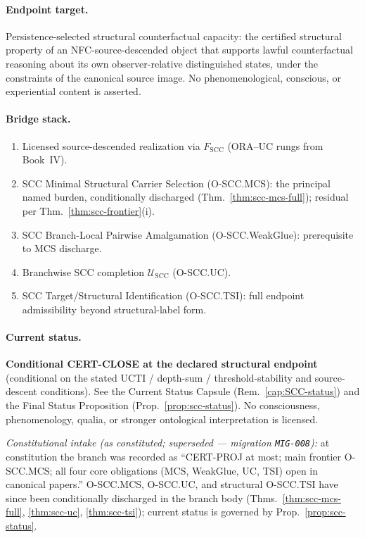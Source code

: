 \documentclass[12pt,oneside]{amsbook}
\theoremstyle{plain}
\theoremstyle{definition}
\theoremstyle{remark}
\begin{document}
\paragraph{Endpoint target.}
Persistence-selected structural counterfactual capacity: the
certified structural property of an NFC-source-descended object
that supports lawful counterfactual reasoning about its own
observer-relative distinguished states, under the constraints of
the canonical source image. No phenomenological, conscious, or
experiential content is asserted.

\paragraph{Bridge stack.}
\begin{enumerate}[label=\textup{(\arabic*)}]
 \item Licensed source-descended realization via
 $F_{\mathrm{SCC}}$ (ORA--UC rungs from Book~IV).
 \item SCC Minimal Structural Carrier Selection (O-SCC.MCS):
 the principal named burden, conditionally discharged
 (Thm.~\ref{thm:scc-mcs-full}); residual per
 Thm.~\ref{thm:scc-frontier}(i).
 \item SCC Branch-Local Pairwise Amalgamation (O-SCC.WeakGlue):
 prerequisite to MCS discharge.
 \item Branchwise SCC completion $\mathcal{U}_{\mathrm{SCC}}$
 (O-SCC.UC).
 \item SCC Target/Structural Identification (O-SCC.TSI): full
 endpoint admissibility beyond structural-label form.
\end{enumerate}

\paragraph{Current status.}
\textbf{Conditional CERT-CLOSE at the declared structural endpoint}
(conditional on the stated UCTI / depth-sum / threshold-stability and
source-descent conditions). See the Current Status Capsule
(Rem.~\ref{cap:SCC-status}) and the Final Status Proposition
(Prop.~\ref{prop:scc-status}). No consciousness, phenomenology, qualia,
or stronger ontological interpretation is licensed.

\emph{Constitutional intake (as constituted; superseded --- migration
\texttt{MIG-008}):} at constitution the branch was recorded as
``CERT-PROJ at most; main frontier O-SCC.MCS; all four core obligations
(MCS, WeakGlue, UC, TSI) open in canonical papers.'' O-SCC.MCS,
O-SCC.UC, and structural O-SCC.TSI have since been conditionally
discharged in the branch body (Thms.~\ref{thm:scc-mcs-full},
\ref{thm:scc-uc}, \ref{thm:scc-tsi}); current status is governed by
Prop.~\ref{prop:scc-status}.
\end{document}
